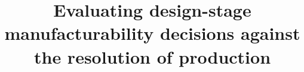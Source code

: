 \documentclass[pdflatex,sn-basic,lineno]{sn-jnl} %
\newif\ifanon
\providecommand{\DIFdelbegin}{} %
\newcommand{\DIFscaledelfig}{0.5}
\newlength{\DIFdelgraphicswidth} %
\newlength{\DIFdelgraphicsheight} %
\newcommand{\DIFdelincludegraphics}[2][]{%
\sbox{\DIFdelgraphicsbox}{\DIFOincludegraphics[#1]{#2}}%
\settoboxwidth{\DIFdelgraphicswidth}{\DIFdelgraphicsbox} %
\settoboxtotalheight{\DIFdelgraphicsheight}{\DIFdelgraphicsbox} %
\scalebox{\DIFscaledelfig}{%
\parbox[b]{\DIFdelgraphicswidth}{\usebox{\DIFdelgraphicsbox}\\[-\baselineskip] \rule{\DIFdelgraphicswidth}{0em}}\llap{\resizebox{\DIFdelgraphicswidth}{\DIFdelgraphicsheight}{%
\setlength{\unitlength}{\DIFdelgraphicswidth}%
\begin{picture}(1,1)%
\thicklines\linethickness{2pt} %
{\color[rgb]{1,0,0}\put(0,0){\framebox(1,1){}}}%
{\color[rgb]{1,0,0}\put(0,0){\line( 1,1){1}}}%
{\color[rgb]{1,0,0}\put(0,1){\line(1,-1){1}}}%
\end{picture}%
}\hspace*{3pt}}} %
} %
\DeclareRobustCommand{\DIFdelbegin}{\DIFOdelbegin \let\includegraphics\DIFdelincludegraphics} %
\begin{document}
\title[Evaluating design-stage manufacturability decisions]{Evaluating design-stage manufacturability decisions against the resolution of production}

\ifanon
\author*[1]{\fnm{Anonymised} \sur{for review}}
\affil*[1]{\orgname{Affiliation withheld for review}}
\else
\author*[1]{ }

\fi

\DIFdelbegin %
\end{document}
